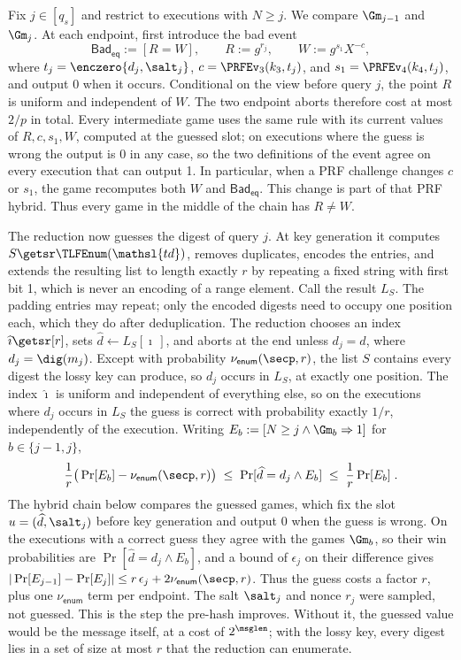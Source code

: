  Fix $j\in[q_s]$ and restrict to executions with $N\ge j$. We compare $\Gm_{j-1}$ and $\Gm_j$. At each endpoint, first introduce the bad event
$$
\mathsf{Bad}_{\mathsf{eq}} := [R=W],
\qquad
R:=g^{r_j},
\qquad
W:=g^{s_1}X^{-c},
$$
where $t_j=\enczero{d_j,\salt_j}$, $c=\PRFEv_3(k_3,t_j)$, and $s_1=\PRFEv_4(k_4,t_j)$, and output 0 when it occurs. Conditional on the view before query $j$, the point $R$ is uniform and independent of $W$. The two endpoint aborts therefore cost at most $2/p$ in total. Every intermediate game uses the same rule with its current values of $R,c,s_1,W$, computed at the guessed slot; on executions where the guess is wrong the output is 0 in any case, so the two definitions of the event agree on every execution that can output 1. In particular, when a PRF challenge changes $c$ or $s_1$, the game recomputes both $W$ and $\mathsf{Bad}_{\mathsf{eq}}$. This change is part of that PRF hybrid. Thus every game in the middle of the chain has $R\ne W$.

The reduction now guesses the digest of query $j$. At key generation it computes $S\getsr\TLFEnum(\mathsl{td})$, removes duplicates, encodes the entries, and extends the resulting list to length exactly $r$ by repeating a fixed string with first bit 1, which is never an encoding of a range element. Call the result $L_S$. The padding entries may repeat; only the encoded digests need to occupy one position each, which they do after deduplication. The reduction chooses an index $\widehat\imath \getsr [r]$, sets $\widehat d \gets L_S[\widehat\imath\,]$, and aborts at the end unless $d_j = \widehat d$, where $d_j = \dig(m_j)$. Except with probability $\nu_{\mathsf{enum}}(\secp,r)$, the list $S$ contains every digest the lossy key can produce, so $d_j$ occurs in $L_S$, at exactly one position. The index $\widehat\imath$ is uniform and independent of everything else, so on the executions where $d_j$ occurs in $L_S$ the guess is correct with probability exactly $1/r$, independently of the execution. Writing $E_b := [N \ge j \land \Gm_b \Rightarrow 1]$ for $b\in\{j-1,j\}$,
$$
\frac{1}{r}\big(\Pr[E_b] - \nu_{\mathsf{enum}}(\secp,r)\big)
\;\le\;
\Pr[\widehat d = d_j \land E_b]
\;\le\;
\frac{1}{r}\Pr[E_b] \;.
$$
The hybrid chain below compares the guessed games, which fix the slot $u=(\widehat d,\salt_j)$ before key generation and output 0 when the guess is wrong. On the executions with a correct guess they agree with the games $\Gm_b$, so their win probabilities are $\Pr[\widehat d = d_j \land E_b]$, and a bound of $\epsilon_j$ on their difference gives $|\Pr[E_{j-1}] - \Pr[E_j]| \le r\,\epsilon_j + 2\nu_{\mathsf{enum}}(\secp,r)$. Thus the guess costs a factor $r$, plus one $\nu_{\mathsf{enum}}$ term per endpoint. The salt $\salt_j$ and nonce $r_j$ were sampled, not guessed. This is the step the pre-hash improves. Without it, the guessed value would be the message itself, at a cost of $2^{\msglen}$; with the lossy key, every digest lies in a set of size at most $r$ that the reduction can enumerate.

